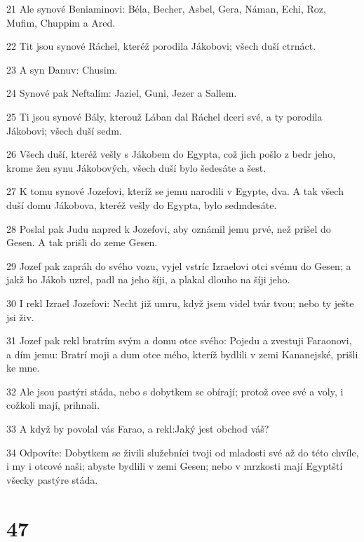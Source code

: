 \par 21 Ale synové Beniaminovi: Béla, Becher, Asbel, Gera, Náman, Echi, Roz, Mufim, Chuppim a Ared.
\par 22 Tit jsou synové Ráchel, kteréž porodila Jákobovi; všech duší ctrnáct.
\par 23 A syn Danuv: Chusim.
\par 24 Synové pak Neftalím: Jaziel, Guni, Jezer a Sallem.
\par 25 Ti jsou synové Bály, kterouž Lában dal Ráchel dceri své, a ty porodila Jákobovi; všech duší sedm.
\par 26 Všech duší, kteréž vešly s Jákobem do Egypta, což jich pošlo z bedr jeho, krome žen synu Jákobových, všech duší bylo šedesáte a šest.
\par 27 K tomu synové Jozefovi, kteríž se jemu narodili v Egypte, dva. A tak všech duší domu Jákobova, kteréž vešly do Egypta, bylo sedmdesáte.
\par 28 Poslal pak Judu napred k Jozefovi, aby oznámil jemu prvé, než prišel do Gesen. A tak prišli do zeme Gesen.
\par 29 Jozef pak zapráh do svého vozu, vyjel vstríc Izraelovi otci svému do Gesen; a jakž ho Jákob uzrel, padl na jeho šíji, a plakal dlouho na šíji jeho.
\par 30 I rekl Izrael Jozefovi: Necht již umru, když jsem videl tvár tvou; nebo ty ješte jsi živ.
\par 31 Jozef pak rekl bratrím svým a domu otce svého: Pojedu a zvestuji Faraonovi, a dím jemu: Bratrí moji a dum otce mého, kteríž bydlili v zemi Kananejské, prišli ke mne.
\par 32 Ale jsou pastýri stáda, nebo s dobytkem se obírají; protož ovce své a voly, i cožkoli mají, prihnali.
\par 33 A když by povolal vás Farao, a rekl:Jaký jest obchod váš?
\par 34 Odpovíte: Dobytkem se živili služebníci tvoji od mladosti své až do této chvíle, i my i otcové naši; abyste bydlili v zemi Gesen; nebo v mrzkosti mají Egyptští všecky pastýre stáda.

\chapter{47}

